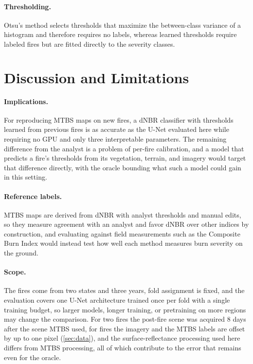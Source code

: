 \documentclass[10pt]{article}
\begin{document}
\paragraph{Thresholding.}
Otsu's method \citep{otsu1979threshold} selects thresholds that maximize the between-class variance of a histogram and therefore requires no labels, whereas learned thresholds require labeled fires but are fitted directly to the severity classes.

\section{Discussion and Limitations}
\label{sec:discussion}

\paragraph{Implications.}
For reproducing MTBS maps on new fires, a dNBR classifier with thresholds learned from previous fires is as accurate as the U-Net evaluated here while requiring no GPU and only three interpretable parameters.
The remaining difference from the analyst is a problem of per-fire calibration, and a model that predicts a fire's thresholds from its vegetation, terrain, and imagery would target that difference directly, with the oracle bounding what such a model could gain in this setting.

\paragraph{Reference labels.}
MTBS maps are derived from dNBR with analyst thresholds and manual edits, so they measure agreement with an analyst and favor dNBR over other indices by construction, and evaluating against field measurements such as the Composite Burn Index would instead test how well each method measures burn severity on the ground.

\paragraph{Scope.}
The fires come from two states and three years, fold assignment is fixed, and the evaluation covers one U-Net architecture trained once per fold with a single training budget, so larger models, longer training, or pretraining on more regions may change the comparison.
For two fires the post-fire scene was acquired 8 days after the scene MTBS used, for \aAlignShifted{} fires the imagery and the MTBS labels are offset by up to one pixel (\cref{sec:data}), and the surface-reflectance processing used here differs from MTBS processing, all of which contribute to the error that remains even for the oracle.
\end{document}
